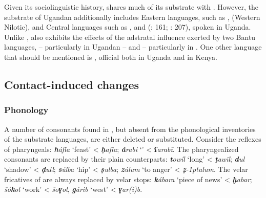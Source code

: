 \documentclass[output=paper]{langsci/langscibook}
\begin{document}
Given its sociolinguistic history,  shares much of its {substrate} with  . However, the {substrate} of Ugandan  additionally includes {Eastern}  languages, such as ,  (Western Nilotic), and Central  languages such as ,  and  (\citealt{Owens1997}: 161; \citealt{Wellens2003}: 207), spoken in Uganda. Unlike  ,  also exhibits the effects of the adstratal influence exerted by two Bantu languages,  – particularly in Ugandan  – and  – particularly in . One other language that should be mentioned is , official both in Uganda and in Kenya.


 
 \subsection{Contact-induced changes}
 \subsubsection{Phonology}

A number of consonants found in , but absent from the phonological inventories of the {substrate} languages, are either deleted or substituted. Consider the reflexes of {pharyngeals}: \textit{\textbf{h}áfla} ‘feast’ <  \textit{\textbf{ḥ}afla}; \textit{\textbf{á}rabi} ‘’ <  \textit{\textbf{ʕ}arabī}. The {pharyngealized} consonants are replaced by their plain counterparts: \textit{\textbf{t}owíl} ‘long’ <  \textit{\textbf{ṭ}awīl}; \textit{\textbf{d}ul} ‘shadow’ <  \textit{\textbf{ḍ}ull}; \textit{\textbf{s}úlba} ‘hip’ <  \textit{\textbf{ṣ}ulba}; \textit{\textbf{z}úlum} ‘to anger’ <  \textit{\textbf{ẓ}\kern -1ptulum}. The velar fricatives of  are always replaced by velar stops: \textit{\textbf{k}ábara} ‘piece of news’ <  \textit{\textbf{ḫ}abar}; \textit{šó\textbf{k}ol} ‘work’ <  \textit{šo\textbf{ɣ}ol}, \textit{\textbf{g}árib} ‘west’ <  \textit{\textbf{ɣ}ar(i)b}. 
\end{document}
